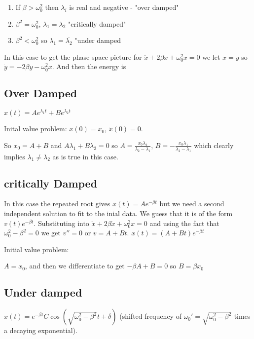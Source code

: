 \documentclass{homework}
\begin{document}
\begin{enumerate}
    \item  If $\beta > \omega_0^2$ then $\lambda_i$ is real and negative - "over damped"
    \item $\beta^2 = \omega_0^2$, $\lambda_1 = \lambda_2$ "critically damped"
    \item $\beta^2 < \omega_0^2$ so $\lambda_1 = \overline{\lambda_2}$ "under damped
\end{enumerate}


In this case to get the phase space picture for $\ddot x + 2\beta \dot x + \omega_0^2 x = 0$ we let $\dot x = y$ so $\dot y = -2\beta y - \omega_0^2x$. And then the energy is 

\subsection{Over Damped}

$x(t) = Ae^{\lambda_1 t} + Be^{\lambda_2 t}$

Inital value problem: $x(0) = x_0$, $\dot x(0) = 0$.

So $x_0 = A + B$ and $A \lambda_1 + B \lambda_2 = 0$ so $A = \frac{x_0 \lambda_2}{\lambda_2 - \lambda_1}$, $B = -\frac{x_0 \lambda_1}{\lambda_2 - \lambda_1}$ which clearly implies $\lambda_1 \neq \lambda_2$ as is true in this case.



\subsection{critically Damped}
In this case the repeated root gives $x(t) = Ae^{-\beta t}$ but we need a second independent solution to fit to the inial data. We guess that it is of the form $v(t)e^{-\beta t}$. Substituting into $\ddot x + 2\beta \dot x + \omega_0^2 x = 0$ and using the fact that $\omega_0^2 - \beta^2 = 0$ we get $v'' = 0$ or $v = A + Bt$. 
$x(t) = (A+Bt)e^{-\beta t}$


Initial value problem:

$A = x_0$, and then we differentiate to get $-\beta A + B = 0$ so $B = \beta x_0$

\subsection{Under damped}
$x(t) = e^{-\beta t}C \cos(\sqrt{\omega_0^2 - \beta^2}t + \delta)$ (shifted frequency of $\omega_0'  = \sqrt{\omega_0^2 - \beta^2}$ times a decaying exponential).
\end{document}
